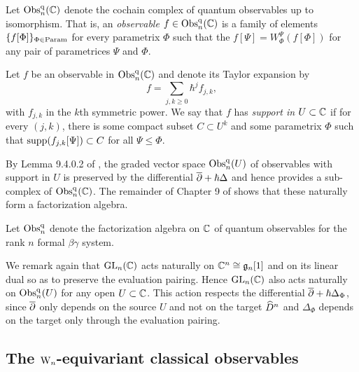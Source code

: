 \begin{dfn}
Let ${\rm Obs}^{\rm q}_n(\mathbb C)$ denote the cochain complex of quantum observables up to isomorphism.
That is, an \emph{observable} $f \in {\rm Obs}^{\rm q}_n(\mathbb C)$ is a family of elements $\{f[\Phi]\}_{\Phi \in {\rm Param}}$ for every parametrix $\Phi$ 
such that the $f[\Psi] = W_\Phi^\Psi(f[\Phi])$ for any pair of parametrices $\Psi$ and $\Phi$.
\end{dfn}

\begin{dfn}
Let $f$ be an observable in ${\rm Obs}^{\rm q}_n(\mathbb C)$ and denote its Taylor expansion by
\[
f = \sum_{j,k \geq 0} \hbar^j f_{j,k},
\]
with $f_{j,k}$ in the $k$th symmetric power. 
We say that $f$ has \emph{support in $U \subset \mathbb C$} if 
for every $(j,k)$, there is some compact subset $C \subset U^k$ and some parametrix $\Phi$
such that ${\rm supp}(f_{j,k}[\Psi]) \subset C$ for all $\Psi \leq \Phi$.
\end{dfn}

By Lemma 9.4.0.2 of \cite{CG2}, the graded vector space ${\rm Obs}^{\rm q}_n(U)$ of observables with support in $U$
is preserved by the differential $\overline{\partial} + \hbar \Delta$ and hence provides a sub-complex of ${\rm Obs}^{\rm q}_n(\mathbb C)$.
The remainder of Chapter 9 of \cite{CG2} shows that these naturally form a factorization algebra.

\begin{dfn}\label{noneq quantum obs}
Let ${\rm Obs}^{\rm q}_n$ denote the factorization algebra on $\mathbb C$ of quantum observables for the rank $n$ formal $\beta\gamma$ system.
\end{dfn}

We remark again that ${\rm GL}_n(\mathbb C)$ acts naturally on $\mathbb C^n \cong \mathfrak{g}_n[1]$
and on its linear dual so as to preserve the evaluation pairing.
Hence ${\rm GL}_n(\mathbb C)$ also acts naturally on ${\rm Obs}^{\rm q}_n(U)$ for any open $U \subset \mathbb C$.
This action respects the differential $\overline{\partial} + \hbar \Delta_\Phi$, 
since $\overline{\partial}$ only depends on the source $U$ and not on the target $\widehat{D}^n$
and $\Delta_\Phi$ depends on the target only through the evaluation pairing.

\subsection{The ${{\rm W}_n}$-equivariant classical observables}

